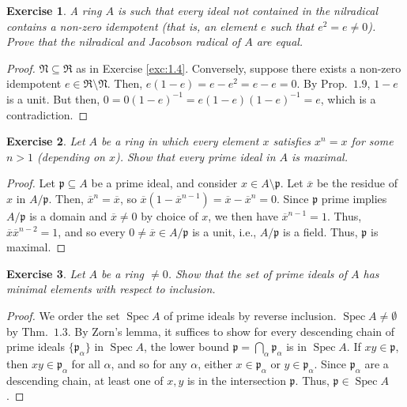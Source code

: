 \documentclass[12pt,letterpaper]{article}
\newtheorem{problem}{Exercise}[section]
\theoremstyle{definition}
\theoremstyle{remark}
\numberwithin{figure}{problem}
\numberwithin{equation}{section}
\DeclareMathOperator{\Spec}{Spec}
\begin{document}
\begin{problem}
  A ring $A$ is such that every ideal not contained in the nilradical contains a non-zero idempotent (that is, an element $e$ such that $e^2 = e \ne 0$). Prove that the nilradical and Jacobson radical of $A$ are equal.
\end{problem}
\begin{proof}
  $\mathfrak{N} \subseteq \mathfrak{R}$ as in Exercise \ref{exc:1.4}. Conversely, suppose there exists a non-zero idempotent $e \in \mathfrak{R} \setminus \mathfrak{N}$. Then, $e(1-e) = e - e^2 = e-e = 0$. By Prop.~$1.9$, $1-e$ is a unit. But then, $0 = 0(1-e)^{-1} = e(1-e)(1-e)^{-1} = e$, which is a contradiction.
\end{proof}

\begin{problem}\label{exc:1.7}
  Let $A$ be a ring in which every element $x$ satisfies $x^n = x$ for some $n > 1$ (depending on $x$). Show that every prime ideal in $A$ is maximal.
\end{problem}
\begin{proof}
  Let $\mathfrak{p} \subseteq A$ be a prime ideal, and consider $x \in A \setminus \mathfrak{p}$. Let $\overline{x}$ be the residue of $x$ in $A/\mathfrak{p}$. Then, $\overline{x}^n = \overline{x}$, so $\overline{x}(1-\overline{x}^{n-1}) = \overline{x} - \overline{x}^n = 0$. Since $\mathfrak{p}$ prime implies $A/\mathfrak{p}$ is a domain and $\overline{x} \ne 0$ by choice of $x$, we then have $\overline{x}^{n-1} = 1$. Thus, $\overline{x}\overline{x}^{n-2} = 1$, and so every $0 \ne \overline{x} \in A/\mathfrak{p}$ is a unit, i.e., $A/\mathfrak{p}$ is a field. Thus, $\mathfrak{p}$ is maximal.
\end{proof}

\begin{problem}\label{exc:1.8}
  Let $A$ be a ring $\ne 0$. Show that the set of prime ideals of $A$ has minimal elements with respect to inclusion.
\end{problem}
\begin{proof}
  We order the set $\Spec A$ of prime ideals by reverse inclusion. $\Spec A \ne \emptyset$ by Thm.~$1.3$. By Zorn's lemma, it suffices to show for every descending chain of prime ideals $\{\mathfrak{p}_\alpha\}$ in $\Spec A$, the lower bound $\mathfrak{p} = \bigcap_\alpha \mathfrak{p}_\alpha$ is in $\Spec A$. If $xy \in \mathfrak{p}$, then $xy \in \mathfrak{p}_\alpha$ for all $\alpha$, and so for any $\alpha$, either $x \in \mathfrak{p}_\alpha$ or $y \in \mathfrak{p}_\alpha$. Since $\mathfrak{p}_\alpha$ are a descending chain, at least one of $x,y$ is in the intersection $\mathfrak{p}$. Thus, $\mathfrak{p} \in \Spec A$.
\end{proof}
\end{document}
